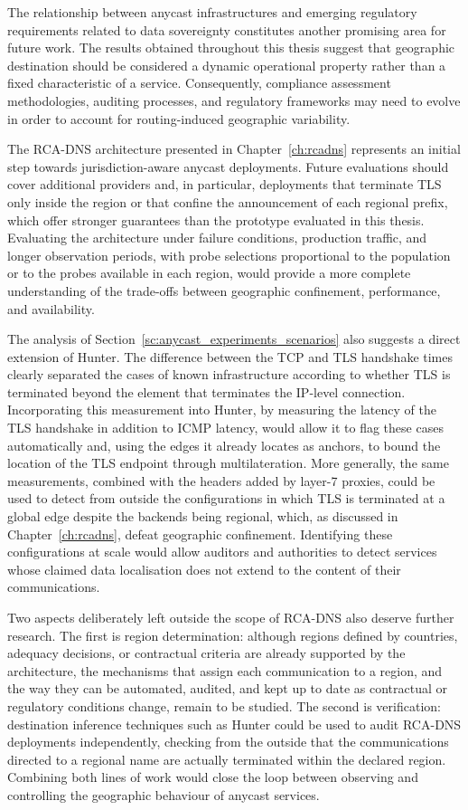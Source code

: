 The relationship between anycast infrastructures and emerging regulatory requirements related to data sovereignty constitutes another promising area for future work. The results obtained throughout this thesis suggest that geographic destination should be considered a dynamic operational property rather than a fixed characteristic of a service. Consequently, compliance assessment methodologies, auditing processes, and regulatory frameworks may need to evolve in order to account for routing-induced geographic variability.

The RCA-DNS architecture presented in Chapter~\ref{ch:rcadns} represents an initial step towards jurisdiction-aware anycast deployments. Future evaluations should cover additional providers and, in particular, deployments that terminate TLS only inside the region or that confine the announcement of each regional prefix, which offer stronger guarantees than the prototype evaluated in this thesis. Evaluating the architecture under failure conditions, production traffic, and longer observation periods, with probe selections proportional to the population or to the probes available in each region, would provide a more complete understanding of the trade-offs between geographic confinement, performance, and availability.

The analysis of Section~\ref{sc:anycast_experiments_scenarios} also suggests a direct extension of Hunter. The difference between the TCP and TLS handshake times clearly separated the cases of known infrastructure according to whether TLS is terminated beyond the element that terminates the IP-level connection. Incorporating this measurement into Hunter, by measuring the latency of the TLS handshake in addition to ICMP latency, would allow it to flag these cases automatically and, using the edges it already locates as anchors, to bound the location of the TLS endpoint through multilateration. More generally, the same measurements, combined with the headers added by layer-7 proxies, could be used to detect from outside the configurations in which TLS is terminated at a global edge despite the backends being regional, which, as discussed in Chapter~\ref{ch:rcadns}, defeat geographic confinement. Identifying these configurations at scale would allow auditors and authorities to detect services whose claimed data localisation does not extend to the content of their communications.

Two aspects deliberately left outside the scope of RCA-DNS also deserve further research. The first is region determination: although regions defined by countries, adequacy decisions, or contractual criteria are already supported by the architecture, the mechanisms that assign each communication to a region, and the way they can be automated, audited, and kept up to date as contractual or regulatory conditions change, remain to be studied. The second is verification: destination inference techniques such as Hunter could be used to audit RCA-DNS deployments independently, checking from the outside that the communications directed to a regional name are actually terminated within the declared region. Combining both lines of work would close the loop between observing and controlling the geographic behaviour of anycast services.

